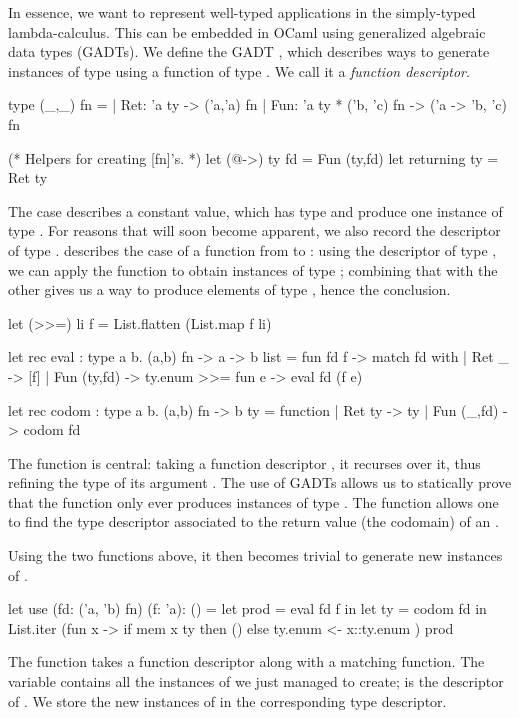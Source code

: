 In essence, we want to represent well-typed applications in the
simply-typed lambda-calculus. This can be embedded in OCaml using generalized
algebraic data types (GADTs). We define the GADT , which
describes ways to generate instances of type  using a function of type
. We call it a \emph{function descriptor}.
%
\begin{ocamlcode}
type (_,_) fn =
| Ret: 'a ty -> ('a,'a) fn
| Fun: 'a ty * ('b, 'c) fn -> ('a -> 'b, 'c) fn

(* Helpers for creating [fn]'s. *)
let (@->) ty fd = Fun (ty,fd)
let returning ty = Ret ty
\end{ocamlcode}
%
The  case describes a constant value, which has type  and
produce one instance of type . For reasons that will soon become
apparent, we also record the descriptor of type .  describes
the case of a function from  to : using the descriptor of type
, we can apply the function to obtain instances of type ;
combining that with the other  gives us a way to produce
elements of type , hence the  conclusion.
%
\begin{ocamlcode}
let (>>=) li f = List.flatten (List.map f li)

let rec eval : type a b. (a,b) fn -> a -> b list =
  fun fd f ->
    match fd with
    | Ret _ -> [f]
    | Fun (ty,fd) ->
        ty.enum >>= fun e -> eval fd (f e)

let rec codom : type a b. (a,b) fn -> b ty =
  function
    | Ret ty -> ty
    | Fun (_,fd) -> codom fd
\end{ocamlcode}
%
The  function is central: taking a function descriptor , it
recurses over it, thus refining the type of its argument . The use of
GADTs allows us to statically prove that the  function only ever
produces instances of type .
%
The  function allows one to find the type
descriptor associated to the return value (the codomain) of an .

Using the two functions above, it then becomes trivial to generate new instances
of .
%
\begin{ocamlcode}
let use (fd: ('a, 'b) fn) (f: 'a): () =
  let prod = eval fd f in
  let ty = codom fd in
  List.iter (fun x -> 
    if mem x ty then () else ty.enum <- x::ty.enum
  ) prod
\end{ocamlcode}
%
The function takes a function descriptor along with a matching function. The
 variable contains all the instances of  we just managed to
create;  is the descriptor of . We store the new
instances of  in the corresponding type descriptor.

